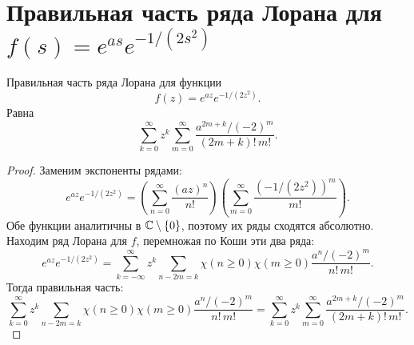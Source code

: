 \documentclass[../paper.tex]{subfiles}
\begin{document}
\section{Правильная часть ряда Лорана для $f(s) = e^{as} e^{-1/(2s^2)}$}
\begin{Th*}
    Правильная часть ряда Лорана для функции
\[
    f(z) = e^{az} e^{-1/(2z^2)}
.\]
Равна
\[
    \sum_{k=0}^{\infty} z^k \sum_{m=0}^{\infty} \frac{a^{2m+k} / (-2)^m}{(2m+k)!\,m!}
.\]
\end{Th*}
\begin{proof}
Заменим экспоненты рядами:
\[
    e^{az} e^{-1/(2z^2)} =
%
    \left( \sum_{n=0}^{\infty} \frac{(az)^n}{n!} \right)
    \left( \sum_{m=0}^{\infty} \frac{\left( -1 / \left( 2z^2 \right) \right)^m}{m!}  \right) 
.\]
Обе функции аналитичны в $\mathbb{C} \setminus \{0\}$, поэтому их ряды сходятся абсолютно. Находим ряд Лорана для $f$, перемножая по Коши эти два ряда:
\[
    e^{az} e^{-1/(2z^2)} =
    \sum_{k=-\infty}^{\infty} z^k \sum_{n-2m=k} \chi(n \ge 0) \chi(m \ge 0) \frac{a^n / (-2)^m}{n!\,m!}
.\]
Тогда правильная часть:
\[
    \sum_{k=0}^{\infty} z^k \sum_{n-2m=k} \chi(n \ge 0) \chi(m \ge 0) \frac{a^n / (-2)^m}{n!\,m!} =
    \sum_{k=0}^{\infty} z^k \sum_{m=0}^{\infty} \frac{a^{2m+k} / (-2)^m}{(2m+k)!\,m!}
.\]
\end{proof}
\end{document}

